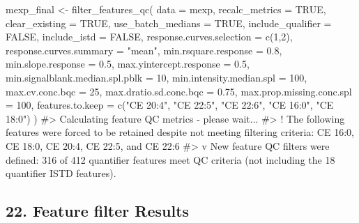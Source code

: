 \documentclass[
  letterpaper,
  DIV=11,
  numbers=noendperiod]{scrartcl}
\newenvironment{Shaded}{\begin{snugshade}}{\end{snugshade}}
\newcommand{\AttributeTok}[1]{\textcolor[rgb]{0.40,0.45,0.13}{#1}}
\newcommand{\CommentTok}[1]{\textcolor[rgb]{0.37,0.37,0.37}{#1}}
\newcommand{\ConstantTok}[1]{\textcolor[rgb]{0.56,0.35,0.01}{#1}}
\newcommand{\DecValTok}[1]{\textcolor[rgb]{0.68,0.00,0.00}{#1}}
\newcommand{\FloatTok}[1]{\textcolor[rgb]{0.68,0.00,0.00}{#1}}
\newcommand{\FunctionTok}[1]{\textcolor[rgb]{0.28,0.35,0.67}{#1}}
\newcommand{\NormalTok}[1]{\textcolor[rgb]{0.00,0.23,0.31}{#1}}
\newcommand{\OtherTok}[1]{\textcolor[rgb]{0.00,0.23,0.31}{#1}}
\newcommand{\SpecialCharTok}[1]{\textcolor[rgb]{0.37,0.37,0.37}{#1}}
\newcommand{\StringTok}[1]{\textcolor[rgb]{0.13,0.47,0.30}{#1}}
\begin{document}
\begin{Shaded}
\begin{Highlighting}[]
\NormalTok{mexp\_final  }\OtherTok{\textless{}{-}} \FunctionTok{filter\_features\_qc}\NormalTok{(}
  \AttributeTok{data =}\NormalTok{  mexp, }
  \AttributeTok{recalc\_metrics =} \ConstantTok{TRUE}\NormalTok{,}
  \AttributeTok{clear\_existing =} \ConstantTok{TRUE}\NormalTok{,  }
  \AttributeTok{use\_batch\_medians =} \ConstantTok{TRUE}\NormalTok{,}
  \AttributeTok{include\_qualifier =} \ConstantTok{FALSE}\NormalTok{,}
  \AttributeTok{include\_istd =} \ConstantTok{FALSE}\NormalTok{,}
  \AttributeTok{response.curves.selection =} \FunctionTok{c}\NormalTok{(}\DecValTok{1}\NormalTok{,}\DecValTok{2}\NormalTok{),}
  \AttributeTok{response.curves.summary =} \StringTok{"mean"}\NormalTok{,}
  \AttributeTok{min.rsquare.response =} \FloatTok{0.8}\NormalTok{,}
  \AttributeTok{min.slope.response =} \FloatTok{0.5}\NormalTok{,}
  \AttributeTok{max.yintercept.response =} \FloatTok{0.5}\NormalTok{,}
  \AttributeTok{min.signalblank.median.spl.pblk =} \DecValTok{10}\NormalTok{,}
  \AttributeTok{min.intensity.median.spl =} \DecValTok{100}\NormalTok{,}
  \AttributeTok{max.cv.conc.bqc =} \DecValTok{25}\NormalTok{,}
  \AttributeTok{max.dratio.sd.conc.bqc =} \FloatTok{0.75}\NormalTok{,}
  \AttributeTok{max.prop.missing.conc.spl =} \DecValTok{100}\NormalTok{,}
  \AttributeTok{features.to.keep =} \FunctionTok{c}\NormalTok{(}\StringTok{"CE 20:4"}\NormalTok{, }\StringTok{"CE 22:5"}\NormalTok{, }\StringTok{"CE 22:6"}\NormalTok{, }\StringTok{"CE 16:0"}\NormalTok{, }\StringTok{"CE 18:0"}\NormalTok{)}
\NormalTok{)}
\CommentTok{\#\textgreater{} Calculating feature QC metrics {-} please wait...}
\CommentTok{\#\textgreater{} ! The following features were forced to be retained despite not meeting filtering criteria: CE 16:0, CE 18:0, CE 20:4, CE 22:5, and CE 22:6}
\CommentTok{\#\textgreater{} v }
\NormalTok{New feature QC filters were defined}\SpecialCharTok{:} \DecValTok{316}\NormalTok{ of }\DecValTok{412}\NormalTok{ quantifier features meet QC }\FunctionTok{criteria}\NormalTok{ (not including the }\DecValTok{18}\NormalTok{ quantifier ISTD features).}
\end{Highlighting}
\end{Shaded}

\subsection{22. Feature filter Results}\label{feature-filter-results}
\end{document}
